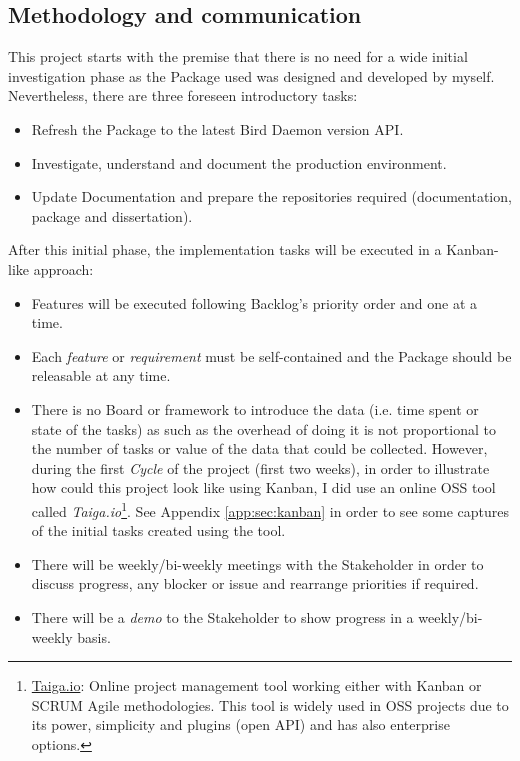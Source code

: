 \subsection{Methodology and communication}
This project starts with the premise that there is no need for a wide initial investigation phase as the Package used was designed and developed by myself. Nevertheless, there are three foreseen introductory tasks:
\begin{itemize}
    \item Refresh the Package to the latest Bird Daemon version API. 
    \item Investigate, understand and document the production environment.
    \item Update Documentation and prepare the repositories required (documentation, package and dissertation).
\end{itemize}

After this initial phase, the implementation tasks will be executed in a Kanban-like approach:
\begin{itemize}
    \item Features will be executed following Backlog's priority order and one at a time.
    \item Each \textit{feature} or \textit{requirement} must be self-contained and the Package should be releasable at any time.
    \item There is no Board or framework to introduce the data (i.e. time spent or state of the tasks) as such as the overhead of doing it is not proportional to the number of tasks or value of the data that could be collected. However, during the first \textit{Cycle} of the project (first two weeks), in order to illustrate how could this project look like using Kanban, I did use an online OSS tool called \textit{Taiga.io}\footnote{\href{https://taiga.io/}{Taiga.io}: Online project management tool working either with Kanban or SCRUM Agile methodologies. This tool is widely used in OSS projects due to its power, simplicity and plugins (open API) and has also enterprise options.}. See Appendix \ref{app:sec:kanban} in order to see some captures of the initial tasks created using the tool.
    \item There will be weekly/bi-weekly meetings with the Stakeholder in order to discuss progress, any blocker or issue and rearrange priorities if required.
    \item There will be a \textit{demo} to the Stakeholder to show progress in a weekly/bi-weekly basis.
\end{itemize}

